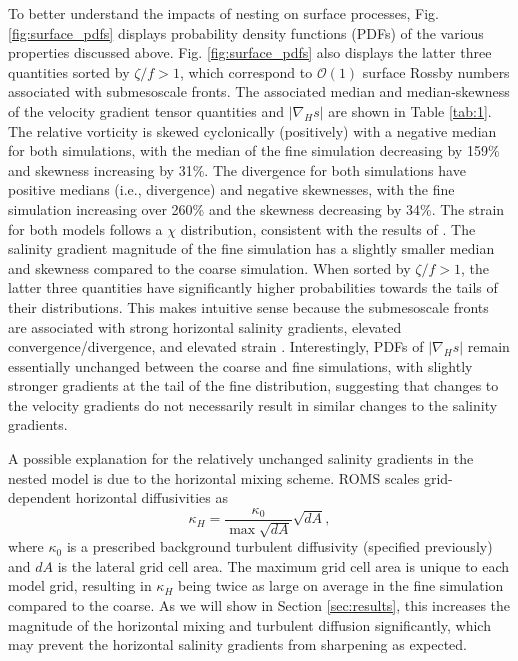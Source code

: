 To better understand the impacts of nesting on surface processes, Fig. \ref{fig:surface_pdfs} displays probability density functions (PDFs) of the various properties discussed above. Fig. \ref{fig:surface_pdfs} also displays the latter three quantities sorted by $\zeta/f>1$, which correspond to $\mathcal{O}(1)$ surface Rossby numbers associated with submesoscale fronts. The associated median and median-skewness of the velocity gradient tensor quantities and $|\nabla_H s|$ are shown in Table \ref{tab:1}. The relative vorticity is skewed cyclonically (positively) with a negative median for both simulations, with the median of the fine simulation decreasing by 159$\%$ and skewness increasing by 31\%. The divergence for both simulations have positive medians (i.e., divergence) and negative skewnesses, with the fine simulation increasing over 260\% and the skewness decreasing by 34\%. The strain for both models follows a $\chi$ distribution, consistent with the results of \citet{Shcherbina_2013}. The salinity gradient magnitude of the fine simulation has a slightly smaller median and skewness compared to the coarse simulation. When sorted by $\zeta/f>1$, the latter three quantities have significantly higher probabilities towards the tails of their distributions. This makes intuitive sense because the submesoscale fronts are associated with strong horizontal salinity gradients, elevated convergence/divergence, and elevated strain \citep{McWilliams_2016}. Interestingly, PDFs of $|\nabla_H s|$ remain essentially unchanged between the coarse and fine simulations, with slightly stronger gradients at the tail of the fine distribution, suggesting that changes to the velocity gradients do not necessarily result in similar changes to the salinity gradients. 

A possible explanation for the relatively unchanged salinity gradients in the nested model is due to the horizontal mixing scheme. ROMS scales grid-dependent horizontal diffusivities as
\begin{equation} \label{eq:kappa_H}
    \kappa_H = \frac{\kappa_{0}}{\max \sqrt{dA}}\sqrt{dA},
\end{equation}
where $\kappa_0$ is a prescribed background turbulent diffusivity (specified previously) and $dA$ is the lateral grid cell area. The maximum grid cell area is unique to each model grid, resulting in $\kappa_H$ being twice as large on average in the fine simulation compared to the coarse. As we will show in Section \ref{sec:results}, this increases the magnitude of the horizontal mixing and turbulent diffusion significantly, which may prevent the horizontal salinity gradients from sharpening as expected. 

